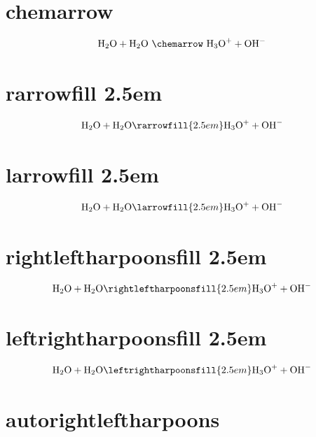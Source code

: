 \documentclass[fleqn,12pt,a4paper]{article}
\begin{document}
\newcommand{\aqua}{\ensuremath{\text{H}_{\text{2}}\text{O}}}
\newcommand{\acid}{\ensuremath{\text{H}_{\text{3}}\text{O}^{\text{+}}}}
\newcommand{\base}{\ensuremath{\text{OH}^{\text{$-$}}}}

\section{chemarrow}


\begin{displaymath}
\aqua + \aqua\ \chemarrow\ \acid + \base
\end{displaymath}


\section{rarrowfill 2.5em}


\begin{displaymath}
\aqua + \aqua \rarrowfill{2.5em} \acid + \base
\end{displaymath}

\section{larrowfill 2.5em}


\begin{displaymath}
\aqua + \aqua \larrowfill{2.5em} \acid + \base
\end{displaymath}


\section{rightleftharpoonsfill 2.5em}


\begin{displaymath}
\aqua + \aqua \rightleftharpoonsfill{2.5em} \acid + \base
\end{displaymath}


\section{leftrightharpoonsfill 2.5em}


\begin{displaymath}
\aqua + \aqua \leftrightharpoonsfill{2.5em} \acid + \base
\end{displaymath}



\section{autorightleftharpoons}
\end{document}
